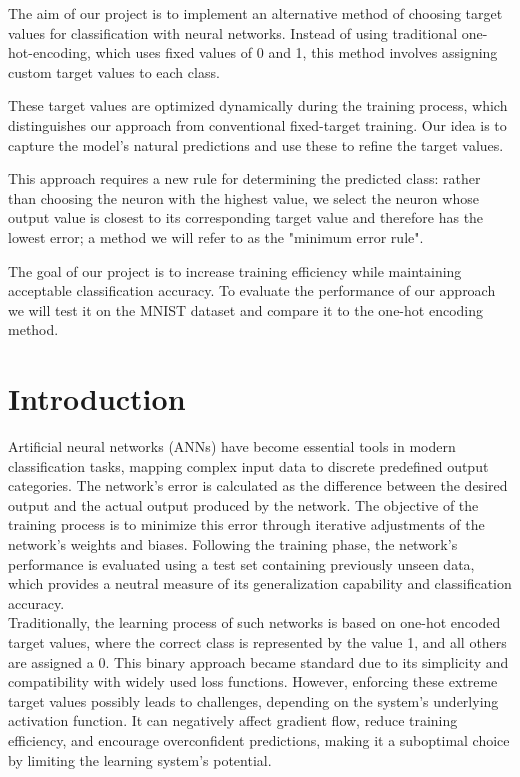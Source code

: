 \documentclass[12pt,fleqn,a4paper]{article}
\begin{document}
\abstract{}
The aim of our project is to implement an alternative method of choosing target values for classification with neural networks.  Instead of using traditional one-hot-encoding, which uses fixed values of 0 and 1, this method involves assigning custom target values to each class. 

These target values are optimized dynamically during the training process, which distinguishes our approach from conventional fixed-target training. Our idea is to capture the model's natural predictions and use these to refine the target values.

This approach requires a new rule for determining the predicted class: rather than choosing the neuron with the highest value, we select the neuron whose output value is closest to its corresponding target value and therefore has the lowest error; a method we will refer to as the "minimum error rule".

The goal of our project is to increase training efficiency while maintaining acceptable classification accuracy. To evaluate the performance of our approach we will test it on the MNIST dataset and compare it to the one-hot encoding method.

\newpage

\section{Introduction}
Artificial neural networks (ANNs) have become essential tools in modern classification tasks, mapping complex input data to discrete predefined output categories. The network's error is calculated as the difference between the desired output and the actual output produced by the network. The objective of the training process is to minimize this error through iterative adjustments of the network's weights and biases. Following the training phase, the network's performance is evaluated using a test set containing previously unseen data, which provides a neutral measure of its generalization capability and classification accuracy. \\

Traditionally, the learning process of such networks is based on one-hot encoded target values, where the correct class is represented by the value 1, and all others are assigned a 0. This binary approach became standard due to its simplicity and compatibility with widely used loss functions. However, enforcing these extreme target values possibly leads to challenges, depending on the system's underlying activation function. It can negatively affect gradient flow, reduce training efficiency, and encourage overconfident predictions, making it a suboptimal choice by limiting the learning system's potential.\\
\end{document}
